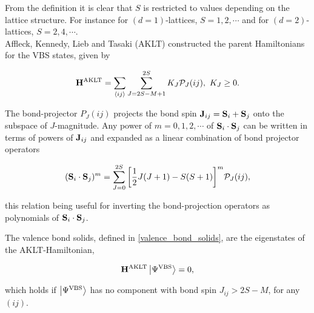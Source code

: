 \documentclass{homework}
\begin{document}
From the definition it is clear that $S$ is restricted to values depending on the lattice structure. For instance for $(d=1)$-lattices, $S = 1, 2, \cdots$ and for $(d=2)$-lattices, $S = 2,4, \cdots$. \\

Affleck, Kennedy, Lieb and Tasaki (AKLT) constructed the parent Hamiltonians for the VBS states, given by 

\begin{equation}
    {\bf H}^{\textnormal{AKLT}} = \sum_{\langle ij \rangle} \sum_{J = 2S-M+1}^{2S} K_J \mathcal{P}_{J}(ij), \textnormal{ } K_J \geq 0.
\end{equation}

The bond-projector $P_J(ij)$ projects the bond spin ${\bf J}_{ij} = {\bf S}_i + {\bf S}_j$ onto the subspace of $J$-magnitude. Any power of $m = 0, 1, 2, \cdots$ of ${\bf S}_i \cdot {\bf S}_j$ can be written in terms of powers of ${\bf J}_{ij}$ and expanded as a linear combination of bond projector operators 

\begin{equation}
    ({\bf S}_i \cdot {\bf S}_j)^m = \sum_{J = 0}^{2S} \bigg[\frac{1}{2} J(J+1) - S(S+1)\bigg]^m \mathcal{P}_J (ij),
\end{equation}

this relation being useful for inverting the bond-projection operators as polynomials of ${\bf S}_i \cdot {\bf S}_j$. \\

\begin{lemma}

The valence bond solids, defined in \cref{valence_bond_solids}, are the eigenstates of the AKLT-Hamiltonian, 

\begin{equation}
     {\bf H}^{\textnormal{AKLT}} \ket{\Psi^{\textnormal{VBS}}} = 0,
\end{equation}

which holds if $\ket{\Psi^{\textnormal{VBS}}}$ has no component with bond spin $J_{ij} > 2S - M $, for any $(ij)$.

\end{lemma}
\end{document}
